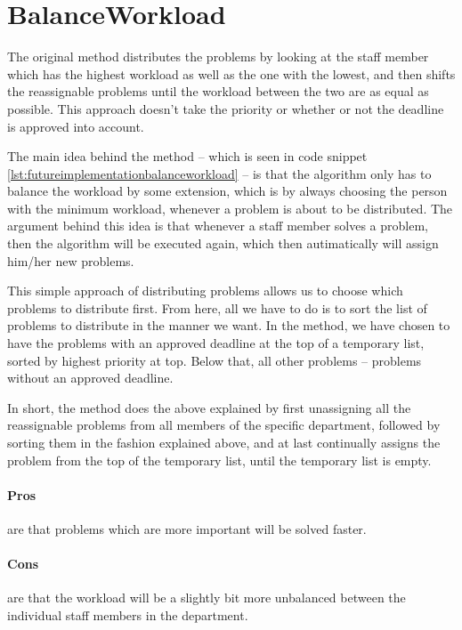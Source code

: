\section{BalanceWorkload}
\label{sec:futureimplementationbalanceworkload}

The original  method distributes the problems by looking at the staff member which has the highest workload as well as the one with the lowest, and then shifts the reassignable problems until the workload between the two are as equal as possible. This approach doesn't take the priority or whether or not the deadline is approved into account. 

The main idea behind the  method -- which is seen in code snippet \ref{lst:futureimplementationbalanceworkload} -- is that the algorithm only has to balance the workload by some extension, which is by always choosing the person with the minimum workload, whenever a problem is about to be distributed. The argument behind this idea is that whenever a staff member solves a problem, then the algorithm will be executed again, which then autimatically will assign him/her new problems.

This simple approach of distributing problems allows us to choose which problems to distribute first. From here, all we have to do is to sort the list of problems to distribute in the manner we want. In the  method, we have chosen to have the problems with an approved deadline at the top of a temporary list, sorted by highest priority at top. Below that, all other problems -- problems without an approved deadline.

In short, the  method does the above explained by first unassigning all the reassignable problems from all members of the specific department, followed by sorting them in the fashion explained above, and at last continually assigns the problem from the top of the temporary list, until the temporary list is empty.

\paragraph{Pros} are that problems which are more important will be solved faster.
\paragraph{Cons} are that the workload will be a slightly bit more unbalanced between the individual staff members in the department.
